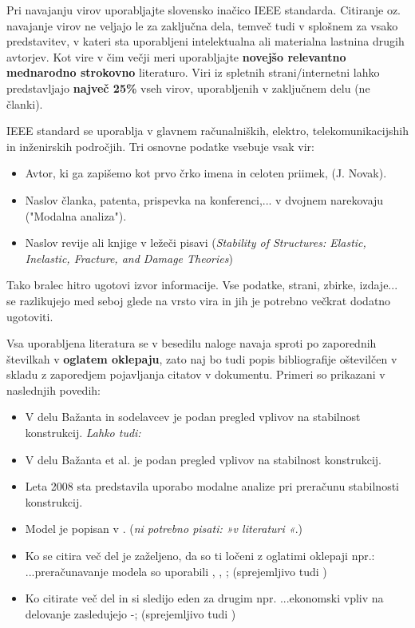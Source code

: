 Pri navajanju virov uporabljajte slovensko inačico IEEE standarda. Citiranje 
oz. navajanje virov ne veljajo le za zaključna dela, temveč tudi v splošnem za 
vsako predstavitev, v kateri sta uporabljeni intelektualna ali materialna 
lastnina drugih avtorjev. Kot vire v čim večji meri uporabljajte 
\textbf{novejšo relevantno mednarodno strokovno} literaturo. Viri iz spletnih 
strani/internetni lahko predstavljajo \textbf{največ 25\%} vseh virov, 
uporabljenih v zaključnem delu (ne članki).

IEEE standard se uporablja v glavnem računalniških, elektro, 
telekomunikacijshih in inženirskih področjih. Tri osnovne podatke vsebuje vsak 
vir:
\begin{itemize}
	\item Avtor, ki ga zapišemo kot prvo črko imena in celoten priimek, (J. 
	Novak).
	\item Naslov članka, patenta, prispevka na konferenci,...  v dvojnem 
	narekovaju ("Modalna analiza").
	\item Naslov revije ali knjige v ležeči pisavi (\emph{Stability of 
		Structures: Elastic, Inelastic, Fracture, and Damage Theories})
\end{itemize}
Tako bralec hitro ugotovi izvor informacije. Vse podatke, strani, zbirke, 
izdaje...  se razlikujejo med seboj glede na vrsto vira in jih je potrebno 
večkrat dodatno ugotoviti. 

Vsa uporabljena literatura se v besedilu naloge navaja sproti po zaporednih 
številkah v \textbf{oglatem oklepaju}, zato naj bo tudi popis bibliografije 
oštevilčen v skladu z zaporedjem pojavljanja citatov v dokumentu. Primeri so 
prikazani v naslednjih povedih:
\begin{itemize}
	\item V delu Bažanta in sodelavcev \cite{bazant_1991} je podan pregled 
	vplivov na stabilnost konstrukcij. \emph{Lahko tudi:}
	\item V delu Bažanta et al. \cite{bazant_1991} je podan pregled vplivov na
	stabilnost konstrukcij.
	\item Leta 2008 sta \citet{Bazant_2008} predstavila 
	uporabo modalne analize pri pre\-ra\-ču\-nu stabilnosti konstrukcij.
	\item Model je popisan v \cite{Doe_1991}. (\emph{ni potrebno pisati: »v 
		literaturi \cite{Doe_1991}«}.)
	\item Ko se citira več del je zaželjeno, da so ti ločeni z oglatimi 
	oklepaji npr.:  ...preračunavanje modela so uporabili \cite{bazant_1991}, 
	\cite{Doe_1991}, \cite{Bazant_2008}; (sprejemljivo tudi 
	\cite{bazant_1991,Doe_1991,Bazant_2008}) 
	\item Ko citirate več del in si sledijo eden za drugim npr. ...ekonomski 
	vpliv na delovanje zasledujejo \cite{bazant_1991}-\cite{Bazant_2008}; 
	(sprejemljivo tudi \cite{bazant_1991, stropnik_1997, 
		Doe_1991,Loukides_2020, Bazant_2008})
\end{itemize}

